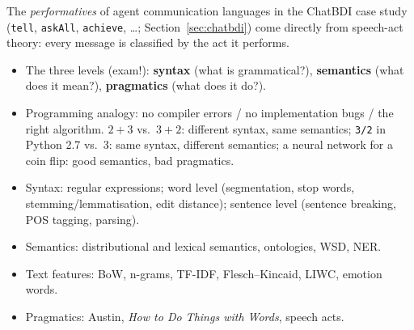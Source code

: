 \begin{nbwhy}
The \emph{performatives} of agent communication languages in the ChatBDI case study
(\texttt{tell}, \texttt{askAll}, \texttt{achieve}, \ldots; Section~\ref{sec:chatbdi}) come
directly from speech-act theory: every message is classified by the act it performs.
\end{nbwhy}

\begin{nbsummary}
\begin{itemize}[nosep]
  \item The three levels (exam!): \textbf{syntax} (what is grammatical?),
        \textbf{semantics} (what does it mean?), \textbf{pragmatics} (what does it do?).
  \item Programming analogy: no compiler errors / no implementation bugs / the right
        algorithm. $2+3$ vs.\ $3+2$: different syntax, same semantics; \texttt{3/2} in
        Python 2.7 vs.\ 3: same syntax, different semantics; a neural network for a coin
        flip: good semantics, bad pragmatics.
  \item Syntax: regular expressions; word level (segmentation, stop words,
        stemming/lemmatisation, edit distance); sentence level (sentence breaking, POS
        tagging, parsing).
  \item Semantics: distributional and lexical semantics, ontologies, WSD, NER.
  \item Text features: BoW, n-grams, TF-IDF, Flesch--Kincaid, LIWC, emotion words.
  \item Pragmatics: Austin, \emph{How to Do Things with Words}, speech acts.
\end{itemize}
\end{nbsummary}
